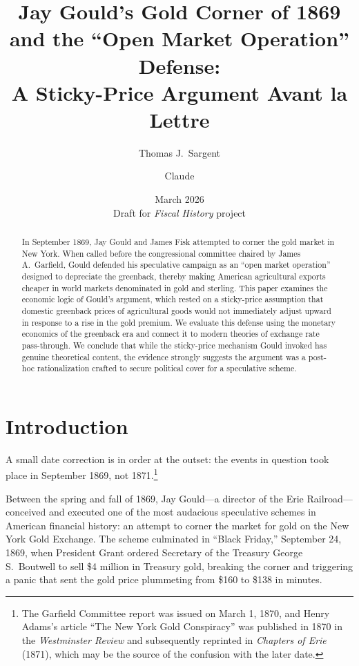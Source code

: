 \documentclass[12pt]{article}
\title{Jay Gould's Gold Corner of 1869 and the ``Open Market Operation'' Defense:\\
A Sticky-Price Argument Avant la Lettre}
\author{Thomas J.\ Sargent \and Claude}
\date{March 2026 \\ \medskip \small Draft for \emph{Fiscal History} project}
\begin{document}
\maketitle

\begin{abstract}
In September 1869, Jay Gould and James Fisk attempted to corner the gold market 
in New York. When called before the congressional committee chaired by 
James A.\ Garfield, Gould defended his speculative campaign as an ``open 
market operation'' designed to depreciate the greenback, thereby making 
American agricultural exports cheaper in world markets denominated in gold 
and sterling. This paper examines the economic logic of Gould's argument, 
which rested on a sticky-price assumption that domestic greenback prices of 
agricultural goods would not immediately adjust upward in response to a 
rise in the gold premium. We evaluate this defense using the monetary 
economics of the greenback era and connect it to modern theories of 
exchange rate pass-through. We conclude that while the sticky-price 
mechanism Gould invoked has genuine theoretical content, the evidence 
strongly suggests the argument was a post-hoc rationalization crafted 
to secure political cover for a speculative scheme.
\end{abstract}

\tableofcontents

\newpage

\section{Introduction}

A small date correction is in order at the outset: the events in question 
took place in September 1869, not 1871.\footnote{The Garfield Committee 
report was issued on March 1, 1870, and Henry Adams's article ``The New 
York Gold Conspiracy'' was published in 1870 in the \emph{Westminster 
Review} and subsequently reprinted in \emph{Chapters of Erie} (1871), 
which may be the source of the confusion with the later date.}

Between the spring and fall of 1869, Jay Gould---a director of the Erie 
Railroad---conceived and executed one of the most audacious speculative 
schemes in American financial history: an attempt to corner the market for 
gold on the New York Gold Exchange. The scheme culminated in ``Black 
Friday,'' September 24, 1869, when President Grant ordered Secretary of 
the Treasury George S.\ Boutwell to sell \$4 million in Treasury gold, 
breaking the corner and triggering a panic that sent the gold price 
plummeting from \$160 to \$138 in minutes.
\end{document}
